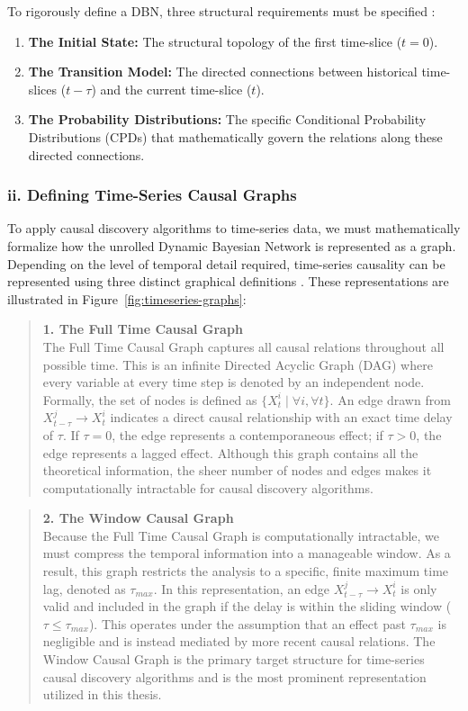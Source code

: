To rigorously define a DBN, three structural requirements must be specified \cite{murphy2012}:
\begin{enumerate}
    \item \textbf{The Initial State:} The structural topology of the first time-slice ($t = 0$).
    \item \textbf{The Transition Model:} The directed connections between historical time-slices ($t - \tau$) and the current time-slice ($t$).
    \item \textbf{The Probability Distributions:} The specific Conditional Probability Distributions (CPDs) that mathematically govern the relations along these directed connections.
\end{enumerate}

\subsubsection*{ii. Defining Time-Series Causal Graphs}

To apply causal discovery algorithms to time-series data, we must mathematically formalize how the unrolled Dynamic Bayesian Network is represented as a graph. Depending on the level of temporal detail required, time-series causality can be represented using three distinct graphical definitions \cite{assaad2022survey}. These representations are illustrated in Figure~\ref{fig:timeseries-graphs}:

\begin{quote}
\textbf{1. The Full Time Causal Graph}\\
The Full Time Causal Graph captures all causal relations throughout all possible time. This is an infinite Directed Acyclic Graph (DAG) where every variable at every time step is denoted by an independent node.  
Formally, the set of nodes is defined as $\{X_t^i \mid \forall i, \forall t \}$. An edge drawn from $X_{t-\tau}^j \rightarrow X_t^i$ indicates a direct causal relationship with an exact time delay of $\tau$. If $\tau = 0$, the edge represents a contemporaneous effect; if $\tau > 0$, the edge represents a lagged effect. 
Although this graph contains all the theoretical information, the sheer number of nodes and edges makes it computationally intractable for causal discovery algorithms.   
\end{quote}

\begin{quote}
\textbf{2. The Window Causal Graph}\\
Because the Full Time Causal Graph is computationally intractable, we must compress the temporal information into a manageable window. As a result, this graph restricts the analysis to a specific, finite maximum time lag, denoted as $\tau_{max}$. 
In this representation, an edge $X_{t-\tau}^j \rightarrow X_t^i$ is only valid and included in the graph if the delay is within the sliding window ($\tau \leq \tau_{max}$). This operates under the assumption that an effect past $\tau_{max}$ is negligible and is instead mediated by more recent causal relations. The Window Causal Graph is the primary target structure for time-series causal discovery algorithms and is the most prominent representation utilized in this thesis. 
\end{quote}

